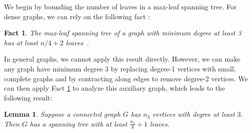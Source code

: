 \documentclass[letterpaper,twoside]{article}
\newtheorem{lemma}{Lemma}
\newtheorem{fact}{Fact}
\begin{document}
We begin by bounding the number of leaves in a max-leaf spanning
tree. For dense graphs, we can rely on the following fact
\cite{KW91,LR98}:
\begin{fact} \label{fact:maxleaf}
  The max-leaf spanning tree of a graph with minimum degree at least
  3 has at least $n/4+2$ leaves~\cite{KW91,LR98}.
\end{fact}
In general graphs, we cannot apply this result directly. However,
we can make any graph have minimum degree 3 by replacing degree-1
vertices with small, complete graphs and by contracting along edges
to remove degree-2 vertices. We can then apply Fact \ref{fact:maxleaf}
to analyze this auxiliary graph, which leads to the following result:
\begin{lemma} \label{lemma:maxleaf}
    Suppose a connected graph $G$ has $n_3$ vertices with degree at
    least $3$. Then $G$ has a spanning tree with at least
    $\frac{n_3}{8} + 1$ leaves.
\end{lemma}
\end{document}
